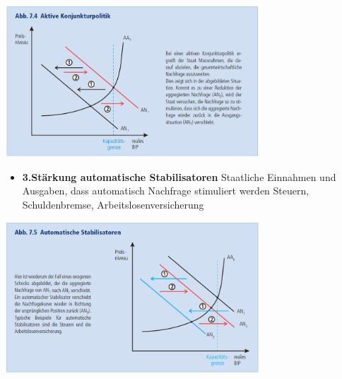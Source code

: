 	\includegraphics[width=9.5cm]{images/keyne.png}
	\begin{itemize}
		\item \textbf{3.Stärkung automatische Stabilisatoren}
		\subitem Staatliche Einnahmen und Ausgaben, dass automatisch Nachfrage stimuliert werden
		\subitem Steuern, Schuldenbremse, Arbeitslosenversicherung
	\end{itemize}
	\includegraphics[width=9.5cm]{images/autostab.png}


